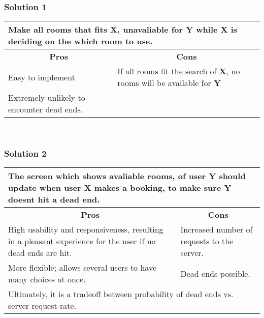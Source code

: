 \subsubsection*{Solution 1}
\begin{tabular}{|p{6cm}|p{6cm}|}
\hline
	\multicolumn{2}{|p{12cm}|}{Make all rooms that fits \textbf{X}, unavaliable for \textbf{Y} while \textbf{X} is deciding on the which room to use.} \\ \hline \hline
	\multicolumn{1}{|c|}{\textbf{Pros}} & \multicolumn{1}{c|}{\textbf{Cons}} \\ \hline
	Easy to implement & If all rooms fit the search of \textbf{X}, no rooms will be available for \textbf{Y} \\ \hline
	Extremely unlikely to encounter dead ends. & \\
	\hline
\end{tabular}
\\
\subsubsection*{Solution 2}
\begin{tabular}{|p{6cm}|p{6cm}|}
\hline
	\multicolumn{2}{|p{12cm}|}{The screen which shows avaliable rooms, of user \textbf{Y} should update when user \textbf{X} makes a booking, to make sure \textbf{Y} doesnt hit a dead end.} \\ \hline \hline
	\multicolumn{1}{|c|}{\textbf{Pros}} & \multicolumn{1}{c|}{\textbf{Cons}} \\ \hline
	High usability and responsiveness, resulting in a pleasant experience for the user if no dead ends are hit. & Increased number of requests to the server. \\ \hline
	More flexible; allows several users to have many choices at once. & Dead ends possible. \\
	\hline
	\multicolumn{2}{|p{12cm}|}{Ultimately, it is a tradeoff between probability of dead ends vs. server request-rate.} \\
	\hline
\end{tabular}

